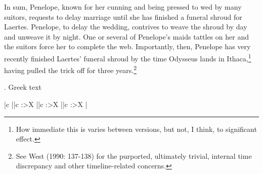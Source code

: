 \documentclass[12pt]{article}
\begin{document}
In sum, Penelope, known for her cunning and being pressed to wed by many suitors, requests to delay marriage until she has finished a funeral shroud for Laertes. Penelope, to delay the wedding, contrives to weave the shroud by day and unweave it by night. One or several of Penelope's maids tattles on her and the suitors force her to complete the web. Importantly, then, Penelope has very recently finished Laertes' funeral shroud by the time Odysseus lands in Ithaca,\footnote{ How immediate this is varies between versions, but not, I think, to significant effect.} having pulled the trick off for three years.\footnote{ See West (1990: 137-138) for the purported, ultimately trivial, internal time discrepancy and other timeline-related concerns.}

\begin{table}

\begin{singlespacing}

\ex. Greek text


\begin{tiny}
\begin{center}
\begin{tabularx}{\textheight}{
|c
||c
:>{\lefting\arraybackslash}X
||c
:>{\lefting\arraybackslash}X
||c
:>{\lefting\arraybackslash}X
|
}


\end{tabularx}
\end{center}
\end{tiny}
\end{singlespacing}
\end{table}
\end{document}
